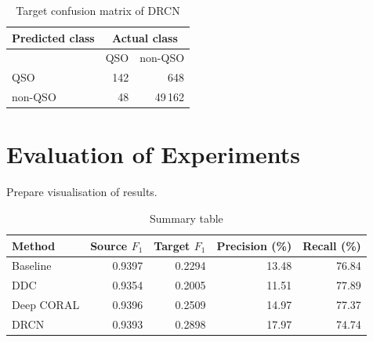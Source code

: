 \begin{table}
\begin{center}
\begin{tabular}{|l|r|r|}
	\hline
	Predicted class & \multicolumn{2}{c|}{Actual class} \\
	\hline \hline
	& QSO & non-QSO \\ \hline
	QSO & 142 & 648 \\ \hline
	non-QSO & 48 & 49\,162 \\ \hline
\end{tabular}
\end{center}
\caption{Target confusion matrix of DRCN}
\end{table}

\section{Evaluation of Experiments}

Prepare visualisation of results.

\begin{table}
\begin{center}
\begin{tabular}{|l|r|r|r|r|}
	\hline
	Method & Source \(F_1\) & Target \(F_1\) & Precision (\%) & Recall (\%) \\
	\hline \hline
	Baseline & 0.9397 & 0.2294 & 13.48 & 76.84 \\ \hline
	DDC & 0.9354 & 0.2005 & 11.51 & 77.89 \\ \hline
	Deep CORAL & 0.9396 & 0.2509 & 14.97 & 77.37 \\ \hline
	DRCN & 0.9393 & 0.2898 & 17.97 & 74.74 \\ \hline
\end{tabular}
\end{center}
\caption{Summary table}
\end{table}
